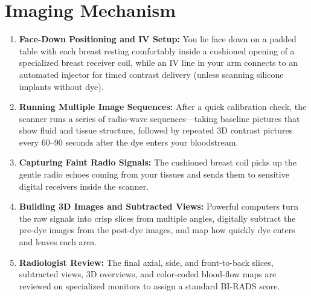 \section{Imaging Mechanism}
\begin{enumerate}
\item \textbf{Face-Down Positioning and IV Setup:} You lie face down on a padded table with each breast resting comfortably inside a cushioned opening of a specialized breast receiver coil, while an IV line in your arm connects to an automated injector for timed contrast delivery (unless scanning silicone implants without dye).
\item \textbf{Running Multiple Image Sequences:} After a quick calibration check, the scanner runs a series of radio-wave sequences---taking baseline pictures that show fluid and tissue structure, followed by repeated 3D contrast pictures every 60--90 seconds after the dye enters your bloodstream.
\item \textbf{Capturing Faint Radio Signals:} The cushioned breast coil picks up the gentle radio echoes coming from your tissues and sends them to sensitive digital receivers inside the scanner.
\item \textbf{Building 3D Images and Subtracted Views:} Powerful computers turn the raw signals into crisp slices from multiple angles, digitally subtract the pre-dye images from the post-dye images, and map how quickly dye enters and leaves each area.
\item \textbf{Radiologist Review:} The final axial, side, and front-to-back slices, subtracted views, 3D overviews, and color-coded blood-flow maps are reviewed on specialized monitors to assign a standard BI-RADS score.
\end{enumerate}

